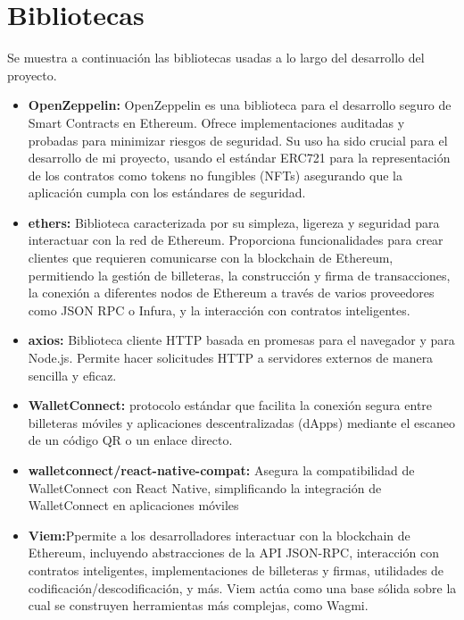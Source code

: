 \section{Bibliotecas}

Se muestra a continuación las bibliotecas usadas a lo largo del desarrollo del proyecto.

\begin{itemize}

\item \textbf{OpenZeppelin:} OpenZeppelin es una biblioteca para el desarrollo seguro de Smart Contracts en Ethereum. Ofrece implementaciones auditadas y probadas para minimizar riesgos de seguridad.
Su uso ha sido crucial para el desarrollo de mi proyecto, usando el estándar ERC721 para la representación de los contratos como tokens no fungibles (NFTs) asegurando que la aplicación cumpla con los estándares de seguridad.

\item \textbf{ethers:} Biblioteca caracterizada por su simpleza, ligereza y seguridad para interactuar con la red de Ethereum. Proporciona funcionalidades para crear clientes que requieren comunicarse con la blockchain de Ethereum, permitiendo la gestión de billeteras, la construcción y firma de transacciones, la conexión a diferentes nodos de Ethereum a través de varios proveedores como JSON RPC o Infura, y la interacción con contratos inteligentes.

\item \textbf{axios:} Biblioteca cliente HTTP basada en promesas para el navegador y para Node.js. Permite hacer solicitudes HTTP a servidores externos de manera sencilla y eficaz.

\item \textbf{WalletConnect:} protocolo estándar que facilita la conexión segura entre billeteras móviles y aplicaciones descentralizadas (dApps) mediante el escaneo de un código QR o un enlace directo.

\item \textbf{walletconnect/react-native-compat:} Asegura la compatibilidad de WalletConnect con React Native, simplificando la integración de WalletConnect en aplicaciones móviles

\item \textbf{Viem:}Ppermite a los desarrolladores interactuar con la blockchain de Ethereum, incluyendo abstracciones de la API JSON-RPC, interacción con contratos inteligentes, implementaciones de billeteras y firmas, utilidades de codificación/descodificación, y más. Viem actúa como una base sólida sobre la cual se construyen herramientas más complejas, como Wagmi.


\end{itemize}
